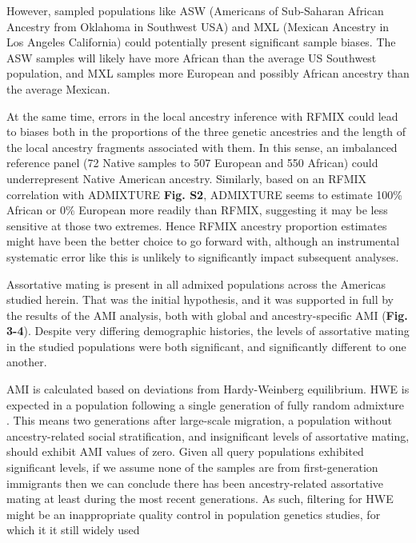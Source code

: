 \documentclass[11pt]{article}
\begin{document}
However, sampled populations like ASW (Americans of Sub-Saharan African Ancestry from Oklahoma in Southwest USA) and  MXL (Mexican Ancestry in Los Angeles California) could potentially present significant sample biases. The ASW samples will likely have more African than the average US Southwest population, and MXL samples more European and possibly African ancestry than the average Mexican.

At the same time, errors in the local ancestry inference with RFMIX could lead to biases both in the proportions of the three genetic ancestries and the length of the local ancestry fragments associated with them. In this sense, an imbalanced reference panel (72 Native samples to 507 European and 550 African) could underrepresent Native American ancestry. Similarly, based on an RFMIX correlation with ADMIXTURE \textbf{Fig. S2}, ADMIXTURE seems to estimate 100\% African or 0\% European more readily than RFMIX, suggesting it may be less sensitive at those two extremes. Hence RFMIX ancestry proportion estimates might have been the better choice to go forward with, although an instrumental systematic error like this is unlikely to significantly impact subsequent analyses.

Assortative mating is present in all admixed populations across the Americas studied herein. That was the initial hypothesis, and it was supported in full by the results of the AMI analysis, both with global and ancestry-specific AMI (\textbf{Fig. 3-4}). Despite very differing demographic histories, the levels of assortative mating in the studied populations were both significant, and significantly different to one another.

AMI is calculated based on deviations from  Hardy-Weinberg equilibrium.  HWE is expected in a population following a single generation of fully random admixture \parencite{Smithjohn2015}. This means two generations after large-scale migration, a population without ancestry-related social stratification, and insignificant levels of assortative mating, should exhibit AMI values of zero. Given all query populations exhibited significant levels, if we assume none of the samples are from first-generation immigrants then we can conclude there has been ancestry-related assortative mating at least during the most recent generations. As such, filtering for HWE might be an inappropriate quality control in population genetics studies, for which it it still widely used \parencite{Linares-Pineda2012,Smithjohn2015}
\end{document}
